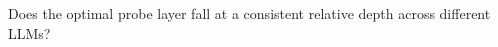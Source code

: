 \begin{rqbox}[RQ3]
Does the optimal probe layer fall at a consistent relative depth across different LLMs?
\end{rqbox}
